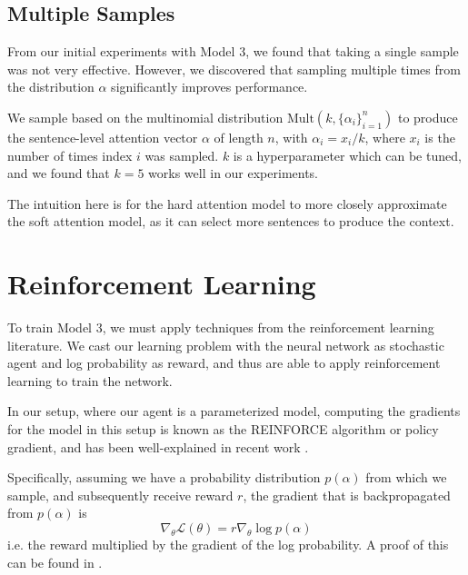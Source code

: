 \documentclass[11pt]{report}
\begin{document}



\subsection{Multiple Samples}

From our initial experiments with Model 3, we found that taking a single sample was not very effective. However, we discovered that sampling multiple times from the distribution $\alpha$ significantly improves performance.

We sample based on the multinomial distribution $\mathrm{Mult}(k, \{\alpha_i\}_{i=1}^n)$ to produce the sentence-level attention vector $\alpha$ of length $n$, with $\alpha_i = x_i / k$, where $x_i$ is the number of times index $i$ was sampled. $k$ is a hyperparameter which can be tuned, and we found that $k=5$ works well in our experiments.

The intuition here is for the hard attention model to more closely approximate the soft attention model, as it can select more sentences to produce the context.

\section{Reinforcement Learning}

To train Model 3, we must apply techniques from the reinforcement learning literature. We cast our learning problem with the neural network as stochastic agent and log probability as reward, and thus are able to apply reinforcement learning to train the network.

In our setup, where our agent is a parameterized model, computing the gradients for the model in this setup is known as the REINFORCE algorithm \citep{williams1992reinforce} or policy gradient, and has been well-explained in recent work \citep{mnih2014visualattention, ba2015visualattention, schulman2015backprop}.

Specifically, assuming we have a probability distribution $p(\alpha)$ from which we sample, and subsequently receive reward $r$, the gradient that is backpropagated from $p(\alpha)$ is
\begin{equation}
\label{policygrad}
\nabla_\theta \mathcal{L}(\theta) = r \nabla_\theta \log p(\alpha)
\end{equation}
i.e. the reward multiplied by the gradient of the log probability. A proof of this can be found in \cite{williams1992reinforce}.
\end{document}
